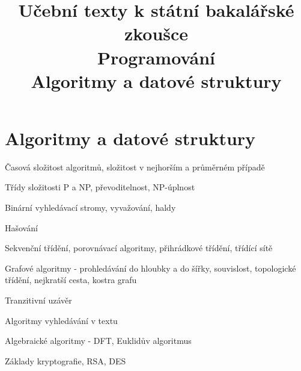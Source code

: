 \clearpage  \clearpage
\title{\LARGE Učební texty k státní bakalářské zkoušce \\ Programování \\ Algoritmy a datové struktury}

\maketitle
\newpage
\setcounter{section}{1}
\section{Algoritmy a datové struktury}
\begin{pozadavky}
\begin{pitemize}
\item Časová složitost algoritmů, složitost v nejhorším a průměrném případě
\item Třídy složitosti P a NP, převoditelnost, NP-úplnost
\item Binární vyhledávací stromy, vyvažování, haldy
\item Hašování
\item Sekvenční třídění, porovnávací algoritmy, přihrádkové třídění, třídící sítě
\item Grafové algoritmy - prohledávání do hloubky a do šířky, souvislost, topologické třídění, nejkratší cesta, kostra grafu
\item Tranzitivní uzávěr
\item Algoritmy vyhledávání v textu
\item Algebraické algoritmy - DFT, Euklidův algoritmus
\item Základy kryptografie, RSA, DES
\end{pitemize}
\end{pozadavky}













